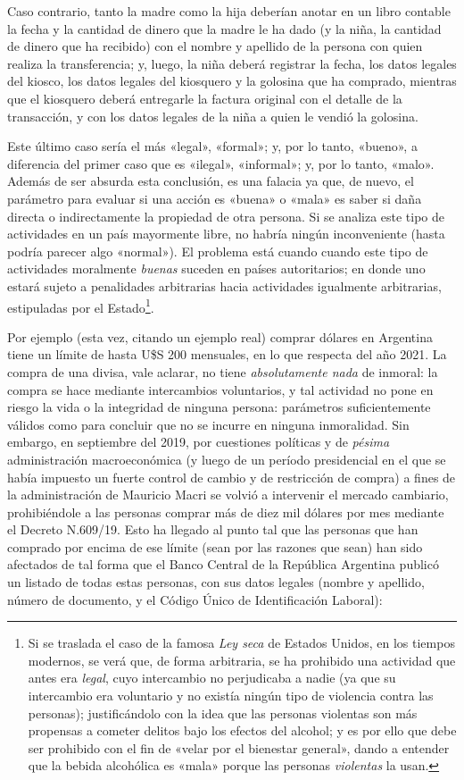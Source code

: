 \documentclass[12pt,a4paper,twoside]{book}
\begin{document}
Caso contrario, tanto la madre como la hija deberían anotar en un libro contable la fecha y la cantidad de dinero que la madre le ha dado (y la niña, la cantidad de dinero que ha recibido) con el nombre y apellido de la persona con quien realiza la transferencia; y, luego, la niña deberá registrar la fecha, los datos legales del kiosco, los datos legales del kiosquero y la golosina que ha comprado, mientras que el kiosquero deberá entregarle la factura original con el detalle de la transacción, y con los datos legales de la niña a quien le vendió la golosina.

Este último caso sería el más «legal», «formal»; y, por lo tanto, «bueno», a diferencia del primer caso que es «ilegal», «informal»; y, por lo tanto, «malo». Además de ser absurda esta conclusión, es una falacia ya que, de nuevo, el parámetro para evaluar si una acción es «buena» o «mala» es saber si daña directa o indirectamente la propiedad de otra persona. Si se analiza este tipo de actividades en un país mayormente libre, no habría ningún inconveniente (hasta podría parecer algo «normal»). El problema está cuando cuando este tipo de actividades moralmente \textit{buenas} suceden en países autoritarios; en donde uno estará sujeto a penalidades arbitrarias hacia actividades igualmente arbitrarias, estipuladas por el Estado\footnote{Si se traslada el caso de la famosa \textit{Ley seca} de Estados Unidos, en los tiempos modernos, se verá que, de forma arbitraria, se ha prohibido una actividad  que antes era \textit{legal}, cuyo intercambio no perjudicaba a nadie (ya que su intercambio era voluntario y no existía ningún tipo de violencia contra las personas); justificándolo con la idea que las personas violentas son más propensas a cometer delitos bajo los efectos del alcohol; y es por ello que debe ser prohibido con el fin de «velar por el bienestar general», dando a entender que la bebida alcohólica es «mala» porque las personas \textit{violentas} la usan.}.

Por ejemplo (esta vez, citando un ejemplo real) comprar dólares en Argentina tiene un límite de hasta U\$S 200 mensuales, en lo que respecta del año 2021. La compra de una divisa, vale aclarar, no tiene \textit{absolutamente nada} de inmoral: la compra se hace mediante intercambios voluntarios, y tal actividad no pone en riesgo la vida o la integridad de ninguna persona: parámetros suficientemente válidos como para concluir que no se incurre en ninguna inmoralidad. Sin embargo, en septiembre del 2019, por cuestiones políticas y de \textit{pésima} administración macroeconómica (y luego de un período presidencial en el que se había impuesto un fuerte control de cambio y de restricción de compra) a fines de la administración de Mauricio Macri se volvió a intervenir el mercado cambiario, prohibiéndole a las personas comprar más de diez mil dólares por mes mediante el Decreto N.609/19. Esto ha llegado al punto tal que las personas que han comprado por encima de ese límite (sean por las razones que sean) han sido afectados de tal forma que el Banco Central de la República Argentina publicó un listado de todas estas personas, con sus datos legales (nombre y apellido, número de documento, y el Código Único de Identificación Laboral):
\end{document}
